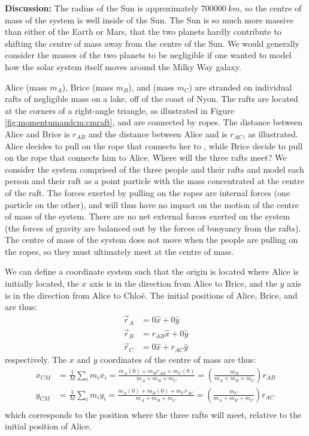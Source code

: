 \begin{example}
\textbf{Discussion:} The radius of the Sun is approximately $\SI{700000}{km}$, so the centre of mass of the system is well inside of the Sun. The Sun is so much more massive than either of the Earth or Mars, that the two planets hardly contribute to shifting the centre of mass away from the centre of the Sun. We would generally consider the masses of the two planets to be negligible if one wanted to model how the solar system itself moves around the Milky Way galaxy.
\end{example}

\begin{example}{
Alice (mass $m_A$), Brice (mass $m_B$), and \chloe (mass $m_C$) are stranded on individual rafts of negligible mass on a lake, off of the coast of Nyon. The rafts are located at the corners of a right-angle triangle, as illustrated in Figure \ref{fig:momentumandcm:cmraft}, and are connected by ropes. The distance between Alice and Brice is $r_{AB}$ and the distance between Alice and \chloe is $r_{AC}$, as illustrated. Alice decides to pull on the rope that connects her to \chloe, while Brice decide to pull on the rope that connects him to Alice. Where will the three rafts meet?}
We consider the system comprised of the three people and their rafts and model each person and their raft as a point particle with the mass concentrated at the centre of the raft. The forces exerted by pulling on the ropes are internal forces (one particle on the other), and will thus have no impact on the motion of the centre of mass of the system. There are no net external forces exerted on the system (the forces of gravity are balanced out by the forces of buoyancy from the rafts). The centre of mass of the system does not move when the people are pulling on the ropes, so they must ultimately meet at the centre of mass.

We can define a coordinate system such that the origin is located where Alice is initially located, the $x$ axis is in the direction from Alice to Brice, and the $y$ axis is in the direction from Alice to Chlo\"e. The initial positions of Alice, Brice, and \chloe are thus:
\begin{align*}
\vec r_A &= 0\hat x + 0\hat y\\
\vec r_B &= r_{AB}\hat x + 0\hat y\\
\vec r_C &= 0\hat x + r_{AC}\hat y
\end{align*}
respectively. The $x$ and $y$ coordinates of the centre of mass are thus:
\begin{align*}
x_{CM} &= \frac{1}{M}\sum_i m_i x_i = \frac{m_A(0) + m_Br_{AB} + m_C(0)}{m_A + m_B + m_C}=\left(\frac{m_B}{m_A + m_B + m_C}\right)r_{AB}\\
y_{CM} &= \frac{1}{M}\sum_i m_i y_i = \frac{m_A(0) + m_B(0) + m_Cr_{AC}}{m_A + m_B + m_C}=\left(\frac{m_C}{m_A + m_B + m_C}\right)r_{AC}\\
\end{align*}
which corresponds to the position where the three rafts will meet, relative to the initial position of Alice.


\end{example}
